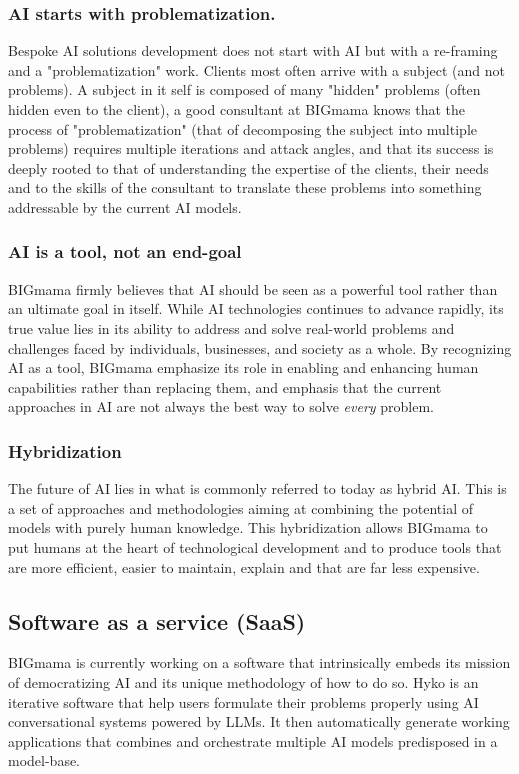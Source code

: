 \documentclass[a4paper,12pt]{article}
\begin{document}
\subsubsection{AI starts with problematization.}
Bespoke AI solutions development does not start with AI but with a re-framing and a "problematization" work. 
Clients most often arrive with a subject (and not problems). A subject in it self is composed of many "hidden" problems (often hidden even to the client), 
a good consultant at BIGmama knows that the process of "problematization" (that of decomposing the subject into multiple problems) requires multiple iterations and attack angles, 
and that its success is deeply rooted to that of understanding the expertise of the clients, their needs and to the skills of the consultant to translate these problems into something addressable 
by the current AI models.

\subsubsection{AI is a tool, not an end-goal}
BIGmama firmly believes that AI should be seen as a powerful tool rather than an ultimate goal in itself. While AI technologies continues to advance rapidly, 
its true value lies in its ability to address and solve real-world problems and challenges faced by individuals, businesses, and society as a whole.
By recognizing AI as a tool, BIGmama emphasize its role in enabling and enhancing human capabilities rather than replacing them, and emphasis that the current 
approaches in AI are not always the best way to solve \textit{every} problem.

\subsubsection{Hybridization}
The future of AI lies in what is commonly referred to today as hybrid AI. 
This is a set of approaches and methodologies aiming at combining the potential of models with purely human knowledge. 
This hybridization allows BIGmama to put humans at the heart of technological development and to produce tools that are more efficient, easier to maintain, 
explain and that are far less expensive.

\subsection{Software as a service (SaaS)}
BIGmama is currently working on a software that intrinsically embeds its mission of democratizing AI and its unique methodology of how to do so. 
Hyko is an iterative software that help users formulate their problems properly using AI conversational systems powered by LLMs. 
It then automatically generate working applications that combines and orchestrate multiple AI models predisposed in a model-base.
\end{document}
